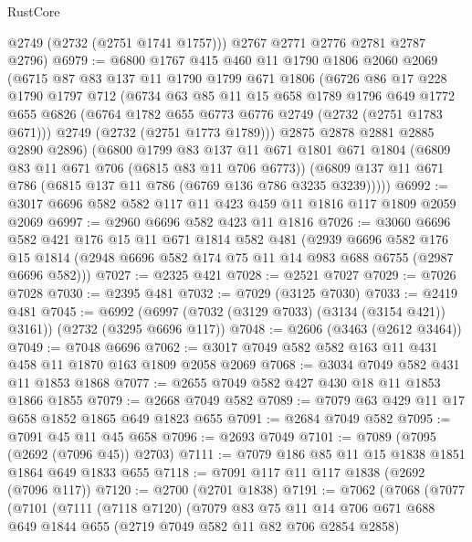 \begin{lexlean}{RustCore}
\begin{coremodule}
        @2749
        (@2732 (@2751 @1741 @1757)))
      @2767
      @2771
      @2776
      @2781
      @2787
      @2796)
@6979 := @6800
    @1767
    @415
    @460
    @11
    @1790
    @1806
    @2060
    @2069
    (@6715
      @87
      @83
      @137
      @11
      @1790
      @1799
      @671
      @1806
      (@6726
        @86
        @17
        @228
        @1790
        @1797
        @712
        (@6734
          @63
          @85
          @11
          @15
          @658
          @1789
          @1796
          @649
          @1772
          @655
          @6826
          (@6764 @1782 @655 @6773 @6776 @2749 (@2732 (@2751 @1783 @671)))
          @2749
          (@2732 (@2751 @1773 @1789)))
        @2875
        @2878
        @2881
        @2885
        @2890
        @2896)
      (@6800
        @1799
        @83
        @137
        @11
        @671
        @1801
        @671
        @1804
        (@6809 @83 @11 @671 @706 (@6815 @83 @11 @706 @6773))
        (@6809 @137 @11 @671 @786 (@6815 @137 @11 @786 (@6769 @136 @786 @3235 @3239)))))
@6992 := @3017 @6696 @582 @582 @117 @11 @423 @459 @11 @1816 @117 @1809 @2059 @2069
@6997 := @2960 @6696 @582 @423 @11 @1816
@7026 := @3060
    @6696
    @582
    @421
    @176
    @15
    @11
    @671
    @1814
    @582
    @481
    (@2939
      @6696
      @582
      @176
      @15
      @1814
      (@2948 @6696 @582 @174 @75 @11 @14 @983 @688 @6755 (@2987 @6696 @582)))
@7027 := @2325 @421
@7028 := @2521 @7027
@7029 := @7026 @7028
@7030 := @2395 @481
@7032 := @7029 (@3125 @7030)
@7033 := @2419 @481
@7045 := @6992 (@6997 (@7032 (@3129 @7033) (@3134 (@3154 @421)) @3161)) (@2732 (@3295 @6696 @117))
@7048 := @2606 (@3463 (@2612 @3464))
@7049 := @7048 @6696
@7062 := @3017 @7049 @582 @582 @163 @11 @431 @458 @11 @1870 @163 @1809 @2058 @2069
@7068 := @3034 @7049 @582 @431 @11 @1853 @1868
@7077 := @2655 @7049 @582 @427 @430 @18 @11 @1853 @1866 @1855
@7079 := @2668 @7049 @582
@7089 := @7079 @63 @429 @11 @17 @658 @1852 @1865 @649 @1823 @655
@7091 := @2684 @7049 @582
@7095 := @7091 @45 @11 @45 @658
@7096 := @2693 @7049
@7101 := @7089 (@7095 (@2692 (@7096 @45)) @2703)
@7111 := @7079 @186 @85 @11 @15 @1838 @1851 @1864 @649 @1833 @655
@7118 := @7091 @117 @11 @117 @1838 (@2692 (@7096 @117))
@7120 := @2700 (@2701 @1838)
@7191 := @7062
    (@7068
      (@7077
        (@7101
          (@7111
            (@7118 @7120)
            (@7079
              @83
              @75
              @11
              @14
              @706
              @671
              @688
              @649
              @1844
              @655
              (@2719 @7049 @582 @11 @82 @706 @2854 @2858)

\end{coremodule}
\end{lexlean}
